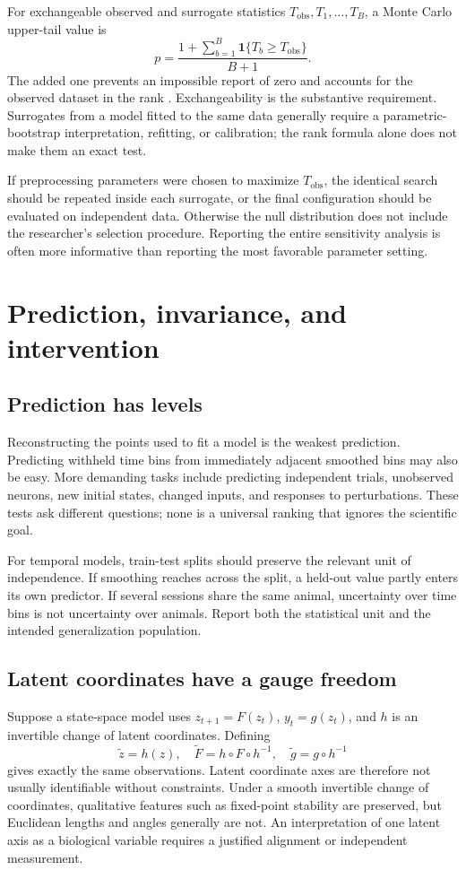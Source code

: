 For exchangeable observed and surrogate statistics \(T_{\mathrm{obs}},T_1,\ldots,T_B\), a Monte Carlo upper-tail value is
\begin{equation}\label{eq:12-montecarlo}
p=\frac{1+\sum_{b=1}^B\mathbf1\{T_b\geq T_{\mathrm{obs}}\}}{B+1}.
\end{equation}
The added one prevents an impossible report of zero and accounts for the observed dataset in the rank \citep{ev_phipson2010}. Exchangeability is the substantive requirement. Surrogates from a model fitted to the same data generally require a parametric-bootstrap interpretation, refitting, or calibration; the rank formula alone does not make them an exact test.

If preprocessing parameters were chosen to maximize \(T_{\mathrm{obs}}\), the identical search should be repeated inside each surrogate, or the final configuration should be evaluated on independent data. Otherwise the null distribution does not include the researcher's selection procedure. Reporting the entire sensitivity analysis is often more informative than reporting the most favorable parameter setting.

\section{Prediction, invariance, and intervention}
\subsection{Prediction has levels}
Reconstructing the points used to fit a model is the weakest prediction. Predicting withheld time bins from immediately adjacent smoothed bins may also be easy. More demanding tasks include predicting independent trials, unobserved neurons, new initial states, changed inputs, and responses to perturbations. These tests ask different questions; none is a universal ranking that ignores the scientific goal.

For temporal models, train-test splits should preserve the relevant unit of independence. If smoothing reaches across the split, a held-out value partly enters its own predictor. If several sessions share the same animal, uncertainty over time bins is not uncertainty over animals. Report both the statistical unit and the intended generalization population.

\subsection{Latent coordinates have a gauge freedom}
Suppose a state-space model uses \(z_{t+1}=F(z_t)\), \(y_t=g(z_t)\), and \(h\) is an invertible change of latent coordinates. Defining
\[
\widetilde z=h(z),\quad
\widetilde F=h\circ F\circ h^{-1},\quad
\widetilde g=g\circ h^{-1}
\]
gives exactly the same observations. Latent coordinate axes are therefore not usually identifiable without constraints. Under a smooth invertible change of coordinates, qualitative features such as fixed-point stability are preserved, but Euclidean lengths and angles generally are not. An interpretation of one latent axis as a biological variable requires a justified alignment or independent measurement.

